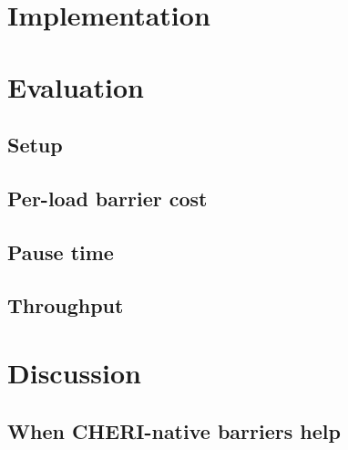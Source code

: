 \documentclass[acmsmall,nonacm]{acmart}
\begin{document}

\section{Implementation}
\label{sec:impl}


\section{Evaluation}
\label{sec:eval}

\subsection{Setup}


\subsection{Per-load barrier cost}


\subsection{Pause time}


\subsection{Throughput}


\section{Discussion}
\label{sec:disc}

\subsection{When CHERI-native barriers help}
\end{document}
